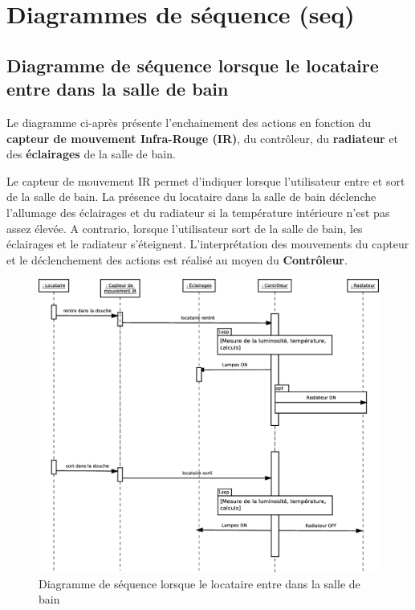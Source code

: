 \chapter{Diagrammes de séquence (seq)}
\section{Diagramme de séquence lorsque le locataire entre dans la salle de bain}
Le diagramme ci-après présente l'enchainement des actions en fonction du \textbf{capteur de mouvement Infra-Rouge (IR)}, du contrôleur, du \textbf{radiateur} et des \textbf{éclairages} de la salle de bain.

Le capteur de mouvement IR permet d'indiquer lorsque l'utilisateur entre et sort de la salle de bain. La présence du locataire dans la salle de bain déclenche l'allumage des éclairages et du radiateur si la température intérieure n'est pas assez élevée. A contrario, lorsque l'utilisateur sort de la salle de bain, les éclairages et le radiateur s'éteignent. L'interprétation des mouvements du capteur et le déclenchement des actions est réalisé au moyen du \textbf{Contrôleur}.

\begin{figure}[H]
	\centering
	\includegraphics[width=1\linewidth]{diagrams/bathroom/diagramme_sequence.eps}
	\caption{Diagramme de séquence lorsque le locataire entre dans la salle de bain}
	\label{fig:diagramme_seq1}
\end{figure}

